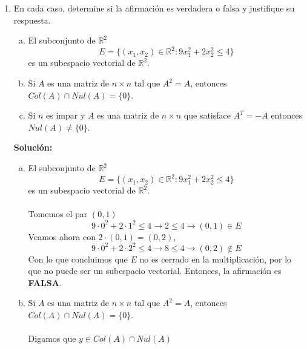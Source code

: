 \documentclass[12pt]{article}
\newenvironment{solucion}
{\begin{mdframed}[backgroundcolor=black!10]
		{\bf Solución:}\\
	}
	{
	\end{mdframed}
}
\newenvironment{preguntas}
{\begin{enumerate}\itemsep12pt
	}
	{
	\end{enumerate}
}
\newcommand{\ra}{\rightarrow}
\newcommand{\R}{\mathbb{R}}
\begin{document}
\begin{preguntas}
\begin{solucion}
$$\begin{bmatrix}
		x+3 & -3-x & 0 & \dots & x+3 \\
		x+3 & 0 & -3 & \dots & x+3 \\
		\vdots & \vdots & \vdots & \ddots & \vdots \\
		0 & 0 & 0 & \dots & -3-x
		\end{bmatrix}\right|$$
		Por último, realizaremos las operaciones $c_1 + c_2$, $c_1 +c_3$, \dots, $c_1 + c_{n-1}$
		$$ \left|\begin{bmatrix}
		-3+x(n-1) & x & x & \dots & x \\
		0 & -3-x & 0 & \dots & x+3 \\
		0 & 0 & -3 & \dots & x+3 \\
		\vdots & \vdots & \vdots & \ddots & \vdots \\
		0 & 0 & 0 & \dots & -3-x
		\end{bmatrix}\right|$$
		Aqui ya podemos multiplicar la diagonal de esta matriz, con lo que el determinante nos queda
		$$det = (-3 + x(n-1)) \cdot (-3-x)^{n-1} = (-3-x)^n + xn(-3-x)^{n-1}$$
\end{solucion}
\item En cada caso, determine si la afirmación es verdadera o falsa y justifique su respuesta.
\begin{enumerate}[a)]
\item El subconjunto de $\R^2$
		$$E=\{(x_1, x_2) \in \R^2:9x_1^2+2x_2^2 \leq 4\}$$
		es un subespacio vectorial de $\R^2$.
\item Si $A$ es una matriz de $n \times n$ tal que $A^2=A$, entonces $Col(A) \cap Nul(A) = \{0\}$.
\item Si $n$ es impar y $A$ es una matriz de $n\times n$ que satisface $A^T = -A$ entonces $Nul(A) \neq \{0\}$.
\end{enumerate}
\begin{solucion}

\begin{enumerate}[a)]
\item El subconjunto de $\R^2$
			$$E=\{(x_1, x_2) \in \R^2:9x_1^2+2x_2^2 \leq 4\}$$
			es un subespacio vectorial de $\R^2$.\\
			\\
			Tomemos el par $(0,1)$
			$$9 \cdot 0^2 + 2 \cdot 1^2 \leq 4 \ra 2 \leq 4 \ra (0,1) \in E$$
			Veamos ahora con $2 \cdot (0,1) = (0,2)$,
			$$9 \cdot 0^2 + 2 \cdot 2^2 \leq 4 \ra 8 \leq 4 \ra (0,2) \not \in E$$
			Con lo que concluimos que $E$ no es cerrado en la multiplicación, por lo que no puede ser un subespacio vectorial. Entonces, la afirmación es {\bf FALSA}.
\item Si $A$ es una matriz de $n \times n$ tal que $A^2=A$, entonces $Col(A) \cap Nul(A) = \{0\}$.\\
			\\
			Digamos que $y \in Col(A) \cap Nul(A)$
			

\end{enumerate}
\end{solucion}
\end{preguntas}
\end{document}
